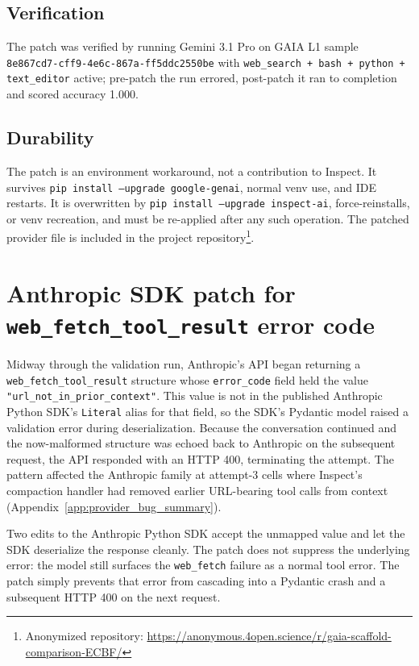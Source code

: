 \documentclass[10pt]{article} %
\begin{document}
        \subsection{Verification}
        
            The patch was verified by running Gemini 3.1 Pro on GAIA L1 sample \texttt{8e867cd7-cff9-4e6c-867a-ff5ddc2550be} with \texttt{web\_search + bash + python + text\_editor} active; pre-patch the run errored, post-patch it ran to completion and scored accuracy 1.000.
        
        \subsection{Durability}
        
            The patch is an environment workaround, not a contribution to Inspect. It survives \texttt{pip install --upgrade google-genai}, normal venv use, and IDE restarts. It is overwritten by \texttt{pip install --upgrade inspect-ai}, force-reinstalls, or venv recreation, and must be re-applied after any such operation. The patched provider file is included in the project repository\footnote{Anonymized repository: \url{https://anonymous.4open.science/r/gaia-scaffold-comparison-ECBF/}}.

\section{Anthropic SDK patch for \texttt{web\_fetch\_tool\_result} error code}\label{app:anthropic_sdk_patch}

    Midway through the validation run, Anthropic's API began returning a \texttt{web\_fetch\_tool\_result} structure whose \texttt{error\_code} field held the value \texttt{"url\_not\_in\_prior\_context"}. This value is not in the published Anthropic Python SDK's \texttt{Literal} alias for that field, so the SDK's Pydantic model raised a validation error during deserialization. Because the conversation continued and the now-malformed structure was echoed back to Anthropic on the subsequent request, the API responded with an HTTP 400, terminating the attempt. The pattern affected the Anthropic family at attempt-3 cells where Inspect's compaction handler had removed earlier URL-bearing tool calls from context (Appendix~\ref{app:provider_bug_summary}).
    
    Two edits to the Anthropic Python SDK accept the unmapped value and let the SDK deserialize the response cleanly. The patch does not suppress the underlying error: the model still surfaces the \texttt{web\_fetch} failure as a normal tool error. The patch simply prevents that error from cascading into a Pydantic crash and a subsequent HTTP 400 on the next request.
    
\end{document}
